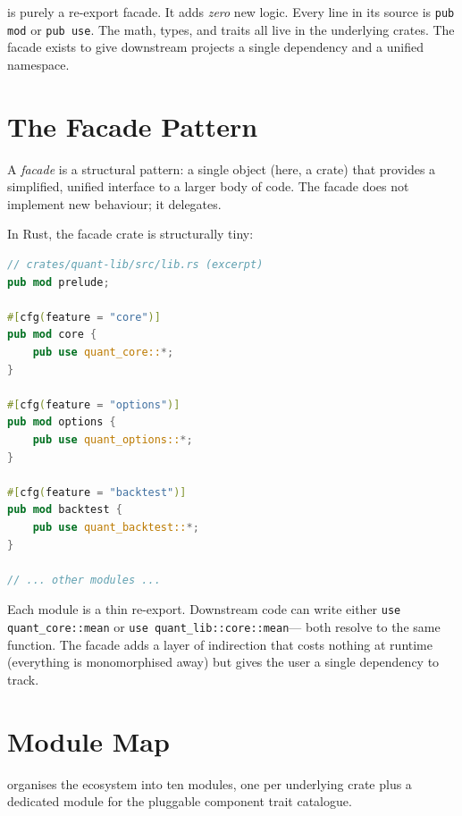 \begin{keyinsight}
 is purely a re-export facade. It adds \emph{zero}
new logic. Every line in its source is \texttt{pub mod} or
\texttt{pub use}. The math, types, and traits all live in the
underlying crates. The facade exists to give downstream projects a
single dependency and a unified namespace.
\end{keyinsight}

\section{The Facade Pattern}

A \emph{facade} is a structural pattern: a single object (here, a
crate) that provides a simplified, unified interface to a larger body
of code. The facade does not implement new behaviour; it delegates.

In Rust, the facade crate is structurally tiny:

\begin{lstlisting}[language=Rust]
// crates/quant-lib/src/lib.rs (excerpt)
pub mod prelude;

#[cfg(feature = "core")]
pub mod core {
    pub use quant_core::*;
}

#[cfg(feature = "options")]
pub mod options {
    pub use quant_options::*;
}

#[cfg(feature = "backtest")]
pub mod backtest {
    pub use quant_backtest::*;
}

// ... other modules ...
\end{lstlisting}

Each module is a thin re-export. Downstream code can write either
\texttt{use quant\_core::mean} or \texttt{use quant\_lib::core::mean}---
both resolve to the same function. The facade adds a layer of
indirection that costs nothing at runtime (everything is monomorphised
away) but gives the user a single dependency to track.

\section{Module Map}

 organises the ecosystem into ten modules, one per
underlying crate plus a dedicated  module for the
pluggable component trait catalogue.

